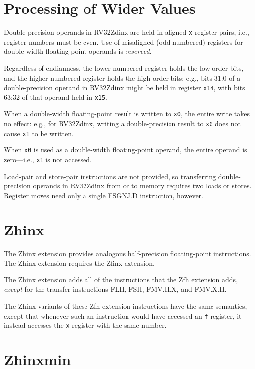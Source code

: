 \section{Processing of Wider Values}

Double-precision operands in RV32Zdinx
are held in aligned {\tt x}-register pairs, i.e.,
register numbers must be even.
Use of misaligned (odd-numbered) registers for double-width floating-point
operands is {\em reserved}.

Regardless of endianness, the lower-numbered register holds the low-order
bits, and the higher-numbered register holds the high-order bits: e.g., bits
31:0 of a double-precision operand in RV32Zdinx might be held in register
{\tt x14}, with bits 63:32 of that operand held in {\tt x15}.

When a double-width floating-point result is written to {\tt x0}, the entire
write takes no effect: e.g., for RV32Zdinx, writing a double-precision result
to {\tt x0} does not cause {\tt x1} to be written.

When {\tt x0} is used as a double-width floating-point operand, the entire
operand is zero---i.e., {\tt x1} is not accessed.

\begin{commentary}
Load-pair and store-pair instructions are not provided, so transferring
double-precision operands in RV32Zdinx from or to memory requires
two loads or stores.
Register moves need only a single FSGNJ.D instruction, however.
\end{commentary}

\section{Zhinx}

The Zhinx extension provides analogous half-precision floating-point
instructions.
The Zhinx extension requires the Zfinx extension.

The Zhinx extension adds all of the instructions that the Zfh extension
adds, {\em except} for the transfer instructions FLH, FSH, FMV.H.X,
and FMV.X.H.

The Zhinx variants of these Zfh-extension instructions have the same semantics,
except that whenever such an instruction would have accessed an {\tt f}
register, it instead accesses the {\tt x} register with the same number.

\section{Zhinxmin}


